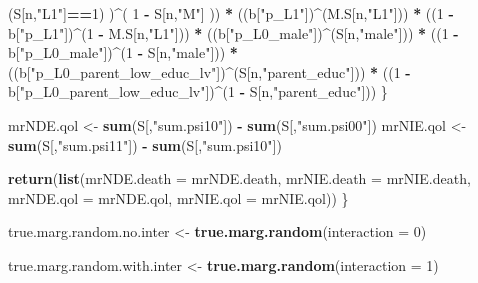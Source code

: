 \documentclass[
]{book}
\newenvironment{Shaded}{\begin{snugshade}}{\end{snugshade}}
\newcommand{\AttributeTok}[1]{\textcolor[rgb]{0.13,0.29,0.53}{#1}}
\newcommand{\DecValTok}[1]{\textcolor[rgb]{0.00,0.00,0.81}{#1}}
\newcommand{\FunctionTok}[1]{\textcolor[rgb]{0.13,0.29,0.53}{\textbf{#1}}}
\newcommand{\NormalTok}[1]{#1}
\newcommand{\OtherTok}[1]{\textcolor[rgb]{0.56,0.35,0.01}{#1}}
\newcommand{\SpecialCharTok}[1]{\textcolor[rgb]{0.81,0.36,0.00}{\textbf{#1}}}
\newcommand{\StringTok}[1]{\textcolor[rgb]{0.31,0.60,0.02}{#1}}
\begin{document}
\begin{Shaded}
\begin{Highlighting}[]
\NormalTok{          (S[n,}\StringTok{"L1"}\NormalTok{]}\SpecialCharTok{==}\DecValTok{1}\NormalTok{) )}\SpecialCharTok{\^{}}\NormalTok{( }\DecValTok{1} \SpecialCharTok{{-}}\NormalTok{ S[n,}\StringTok{"M"}\NormalTok{] )) }\SpecialCharTok{*}
\NormalTok{      ((b[}\StringTok{"p\_L1"}\NormalTok{])}\SpecialCharTok{\^{}}\NormalTok{(M.S[n,}\StringTok{"L1"}\NormalTok{])) }\SpecialCharTok{*}
\NormalTok{      ((}\DecValTok{1} \SpecialCharTok{{-}}\NormalTok{ b[}\StringTok{"p\_L1"}\NormalTok{])}\SpecialCharTok{\^{}}\NormalTok{(}\DecValTok{1} \SpecialCharTok{{-}}\NormalTok{ M.S[n,}\StringTok{"L1"}\NormalTok{])) }\SpecialCharTok{*}
\NormalTok{      ((b[}\StringTok{"p\_L0\_male"}\NormalTok{])}\SpecialCharTok{\^{}}\NormalTok{(S[n,}\StringTok{"male"}\NormalTok{])) }\SpecialCharTok{*} 
\NormalTok{      ((}\DecValTok{1} \SpecialCharTok{{-}}\NormalTok{ b[}\StringTok{"p\_L0\_male"}\NormalTok{])}\SpecialCharTok{\^{}}\NormalTok{(}\DecValTok{1} \SpecialCharTok{{-}}\NormalTok{ S[n,}\StringTok{"male"}\NormalTok{])) }\SpecialCharTok{*} 
\NormalTok{      ((b[}\StringTok{"p\_L0\_parent\_low\_educ\_lv"}\NormalTok{])}\SpecialCharTok{\^{}}\NormalTok{(S[n,}\StringTok{"parent\_educ"}\NormalTok{])) }\SpecialCharTok{*}
\NormalTok{      ((}\DecValTok{1} \SpecialCharTok{{-}}\NormalTok{ b[}\StringTok{"p\_L0\_parent\_low\_educ\_lv"}\NormalTok{])}\SpecialCharTok{\^{}}\NormalTok{(}\DecValTok{1} \SpecialCharTok{{-}}\NormalTok{ S[n,}\StringTok{"parent\_educ"}\NormalTok{])) }
\NormalTok{    \}}
  
\NormalTok{  mrNDE.qol }\OtherTok{\textless{}{-}} \FunctionTok{sum}\NormalTok{(S[,}\StringTok{"sum.psi10"}\NormalTok{]) }\SpecialCharTok{{-}} \FunctionTok{sum}\NormalTok{(S[,}\StringTok{"sum.psi00"}\NormalTok{])}
\NormalTok{  mrNIE.qol }\OtherTok{\textless{}{-}} \FunctionTok{sum}\NormalTok{(S[,}\StringTok{"sum.psi11"}\NormalTok{]) }\SpecialCharTok{{-}} \FunctionTok{sum}\NormalTok{(S[,}\StringTok{"sum.psi10"}\NormalTok{])}
  
  \FunctionTok{return}\NormalTok{(}\FunctionTok{list}\NormalTok{(}\AttributeTok{mrNDE.death =}\NormalTok{ mrNDE.death, }\AttributeTok{mrNIE.death =}\NormalTok{ mrNIE.death, }
              \AttributeTok{mrNDE.qol =}\NormalTok{ mrNDE.qol, }\AttributeTok{mrNIE.qol =}\NormalTok{ mrNIE.qol))}
\NormalTok{\}}
\end{Highlighting}
\end{Shaded}

\begin{Shaded}
\begin{Highlighting}[]
\NormalTok{true.marg.random.no.inter }\OtherTok{\textless{}{-}} \FunctionTok{true.marg.random}\NormalTok{(}\AttributeTok{interaction =} \DecValTok{0}\NormalTok{)}

\NormalTok{true.marg.random.with.inter }\OtherTok{\textless{}{-}} \FunctionTok{true.marg.random}\NormalTok{(}\AttributeTok{interaction =} \DecValTok{1}\NormalTok{)}
\end{Highlighting}
\end{Shaded}
\end{document}
